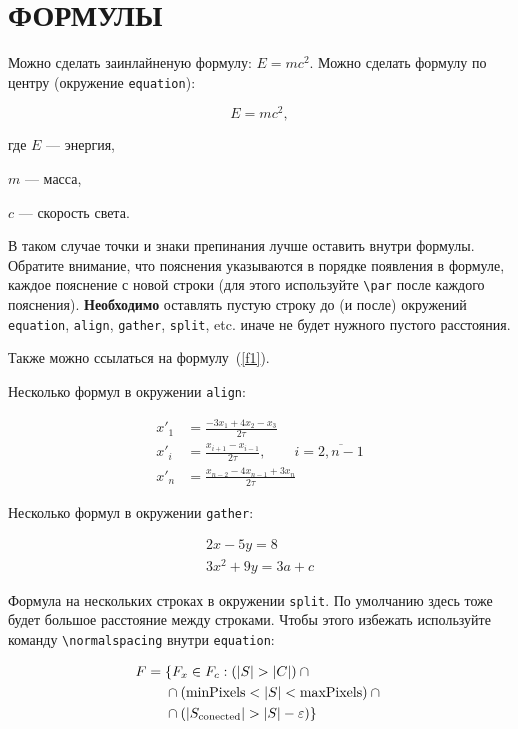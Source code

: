 \section{ФОРМУЛЫ}

Можно сделать заинлайненую формулу: $E = mc^2$. Можно сделать формулу по центру (окружение \texttt{equation}):

\begin{equation}
    \label{f1}
    E = mc^2,
\end{equation}

где $E$ --- энергия,\par $m$ --- масса,\par $c$ --- скорость света.

В таком случае точки и знаки препинания лучше оставить внутри формулы. Обратите внимание, что пояснения указываются в порядке появления в формуле, каждое пояснение с новой строки (для этого используйте \texttt{\textbackslash par} после каждого пояснения). \textbf{Необходимо} оставлять пустую строку до (и после) окружений \texttt{equation}, \texttt{align}, \texttt{gather}, \texttt{split}, etc. иначе не будет нужного пустого расстояния.  

Также можно ссылаться на формулу~(\ref{f1}).

Несколько формул в окружении \texttt{align}:

\begin{align}
x'_1 &= \frac{-3 x_1 + 4 x_2 - x_3}{2 \tau} \\
x'_i &= \frac{x_{i+1} - x_{i-1}}{2 \tau}, \qquad i = \overline{2, n-1} \\
x'_n &= \frac{x_{n-2} - 4 x_{n-1} + 3 x_n}{2 \tau}
\end{align}

Несколько формул в окружении \texttt{gather}:

\begin{gather} 
2x - 5y =  8 \\ 
3x^2 + 9y =  3a + c
\end{gather}

Формула на нескольких строках в окружении \texttt{split}. По умолчанию здесь тоже будет большое расстояние между строками. Чтобы этого избежать используйте команду \texttt{\textbackslash normalspacing} внутри \texttt{equation}:

\begin{equation}
\normalspacing
\begin{split}
F = {} &\{F_{x} \in  F_{c} : (|S| > |C|) \cap {} \\
& \cap (\mathrm{minPixels}  < |S| < \mathrm{maxPixels}) \cap {} \\
& \cap (|S_{\mathrm{conected}}| > |S| - \varepsilon) \}
\end{split}
\end{equation}